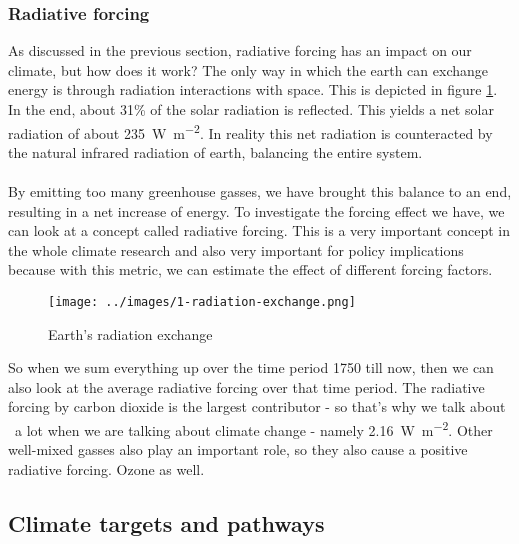 \documentclass[../summary.tex]{subfiles}
\begin{document}
\subsubsection{Radiative forcing}
As discussed in the previous section, radiative forcing has an impact on our climate, but how does it work? The only way in which the earth can exchange energy is through radiation interactions with space. This is depicted in figure \ref{fig:radiation-exchange}. In the end, about 31\% of the solar radiation is reflected. This yields a net solar radiation of about \SI{235}{\watt\per\square\metre}. In reality this net radiation is counteracted by the natural infrared radiation of earth, balancing the entire system.
\\\\
By emitting too many greenhouse gasses, we have brought this balance to an end, resulting in a net increase of energy. To investigate the forcing effect we have, we can look at a concept called radiative forcing. This is a very important concept in the whole climate research and also very important for policy implications because with this metric, we can estimate the effect of different forcing factors.
\\
\begin{figure}[h]
	\centering
	\texttt{[image: ../images/1-radiation-exchange.png]}
	\caption{Earth's radiation exchange}
	\label{fig:radiation-exchange}
\end{figure}
\newpage
So when we sum everything up over the time period 1750 till now, then we can also look at the average radiative forcing over that time period. The radiative forcing by carbon dioxide is the largest contributor - so that's why we talk about \COtwo\ a lot when we are talking about climate change - namely \SI{2.16}{\watt\per\square\metre}. Other well-mixed gasses also play an important role, so they also cause a positive radiative forcing. Ozone as well.

\subsection{Climate targets and pathways}
\end{document}
